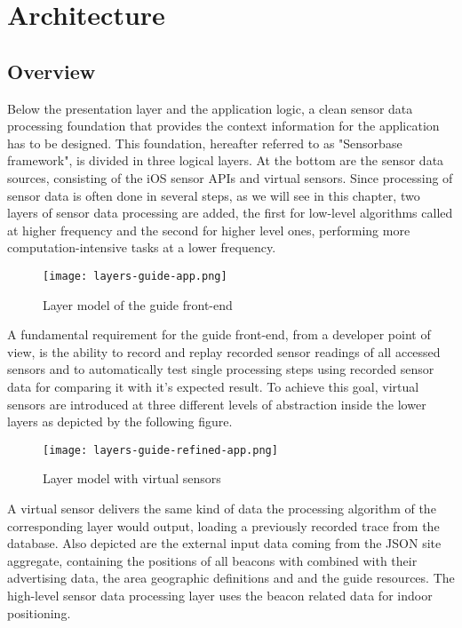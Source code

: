 \section{Architecture}

\subsection{Overview}

Below the presentation layer and the application logic, a clean sensor data processing foundation that provides the context information for the application has to be designed. This foundation, hereafter referred to as "Sensorbase framework", is divided in three logical layers. At the bottom are the sensor data sources, consisting of the iOS sensor APIs and virtual sensors. Since processing of sensor data is often done in several steps, as we will see in this chapter, two layers of sensor data processing are added, the first for low-level  algorithms called at higher frequency and the second for higher level ones, performing more computation-intensive tasks at a lower frequency.  

\begin{figure}[H]
\centering
\texttt{[image: layers-guide-app.png]}
\caption{Layer model of the guide front-end}
\end{figure}

A fundamental requirement for the guide front-end, from a developer point of view, is the ability to record and replay recorded sensor readings of all accessed sensors and to automatically test single processing steps using recorded sensor data for comparing it with it's expected result.
To achieve this goal, virtual sensors are introduced at three different levels of abstraction inside the lower layers as depicted by the following figure.
 
\begin{figure}[H]
\centering
\texttt{[image: layers-guide-refined-app.png]}
\caption{Layer model with virtual sensors}
\end{figure} 

A virtual sensor delivers the same kind of data the processing algorithm of the corresponding layer would output, loading a previously recorded trace from the database. 
Also depicted are the external input data coming from the JSON site aggregate, containing the positions of all beacons with combined with their advertising data, the area geographic definitions and and the guide resources. The high-level sensor data processing layer uses the beacon related data for indoor positioning.


